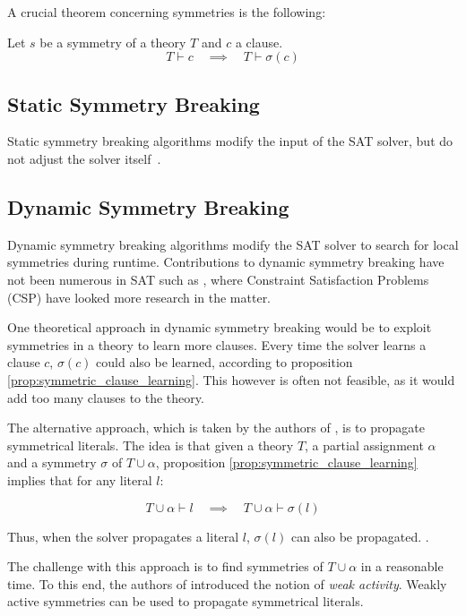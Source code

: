 				A crucial theorem concerning symmetries is the following: \\

				\begin{proposition}
					\label{prop:symmetric_clause_learning}
					Let $s$ be a symmetry of a theory $T$ and $c$ a clause.
					\begin{equation}
						T \vdash c \quad \implies \quad T \vdash \sigma( c )
					\end{equation}
				\end{proposition}

		\subsection{Static Symmetry Breaking}
			Static symmetry breaking algorithms modify the input of the SAT solver, but do not
			adjust the solver itself~\cite{sakallah2009symmetry}.

		\subsection{Dynamic Symmetry Breaking}
			Dynamic symmetry breaking algorithms modify the SAT solver to search for local
			symmetries during runtime. Contributions to dynamic symmetry breaking have not been
			numerous in SAT such as \cite{sabharwal2005symchaff}, where Constraint Satisfaction
			Problems (CSP) have looked more research in the matter.

			One theoretical approach in dynamic symmetry breaking would be to exploit symmetries in
			a theory to learn more clauses.
			Every time the solver learns a clause $c$, $\sigma(c)$ could also be learned, according
			to proposition \ref{prop:symmetric_clause_learning}.
			This however is often not feasible, as it would add too many clauses to the theory.

			The alternative approach, which is taken by the authors of
			\cite{devriendt2012symmetry}, is to propagate symmetrical literals.
			The idea is that given a theory $T$, a partial assignment $\alpha$ and a symmetry
			$\sigma$ of $T \cup \alpha$, proposition \ref{prop:symmetric_clause_learning} implies
			that for any literal $l$:

			\begin{equation}
				T \cup \alpha \vdash l \quad
				\implies
				\quad T \cup \alpha \vdash \sigma(l)
			\end{equation}

			Thus, when the solver propagates a literal $l$, $\sigma(l)$ can also be propagated.
			.

			The challenge with this approach is to find symmetries of $T \cup \alpha$ in a
			reasonable time.
			To this end, the authors of \cite{devriendt2012symmetry} introduced the notion of
			\emph{weak activity}.
			Weakly active symmetries can be used to propagate symmetrical literals.

	\newpage
	
	

